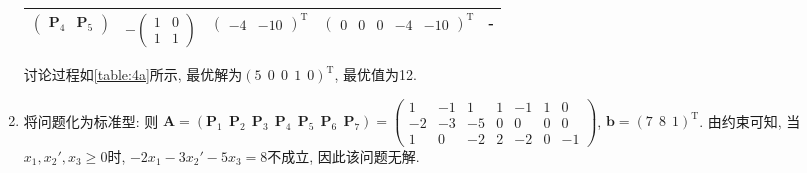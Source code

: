 \begin{enumerate}[label=\alph*)]
\begin{table}[ht]
{\begin{tabular}{ccccc}
                    $\begin{pmatrix}\bm{P}_4 & \bm{P}_5\end{pmatrix}$ &
                    $-\begin{pmatrix} 1 & 0 \\ 1 & 1 \end{pmatrix}$ &
                    $\begin{pmatrix}-4 & -10\end{pmatrix}^\mathrm{T}$ &
                    $\begin{pmatrix}0 & 0 & 0 & -4 & -10\end{pmatrix}^\mathrm{T}$ &
                    - \\

                    \bottomrule
                \end{tabular}
            }
        \end{table}
        讨论过程如\cref{table:4a}所示, 最优解为$(5 ~~ 0 ~~ 0 ~~ 1 ~~ 0)^\mathrm{T}$, 最优值为12.

    \item
        将问题化为标准型:
        则
        $
        \bm{A}
        =(\bm{P}_1 ~~ \bm{P}_2 ~~ \bm{P}_3 ~~ \bm{P}_4 ~~ \bm{P}_5 ~~ \bm{P}_6 ~~ \bm{P}_7)
        =\begin{pmatrix}
            1 & -1 & 1 & 1 & -1 & 1 & 0 \\
            -2 & -3 & -5 & 0 & 0 & 0 & 0 \\
            1 & 0 & -2 & 2 & -2 & 0 & -1
        \end{pmatrix}
        $, $\bm{b}=(7 ~~ 8 ~~ 1)^\mathrm{T}$.
        由约束可知, 当$x_1,x_2',x_3\geq0$时, $-2x_1-3x_2'-5x_3=8$不成立, 因此该问题无解.
\end{enumerate}
